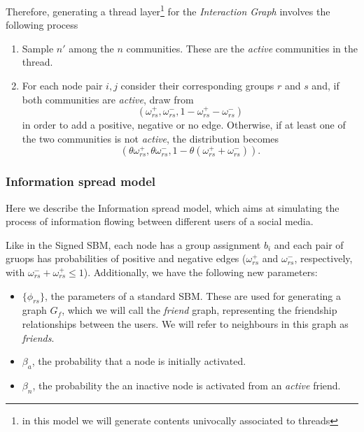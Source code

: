 Therefore, generating a thread layer\footnote{in this model we will generate contents univocally associated to threads} for the \emph{Interaction Graph} involves the following process
\begin{enumerate}
	\item Sample $n'$ among the $n$ communities. These are the
	      \emph{active} communities in the thread.
	\item For each node pair $i, j$ consider their corresponding groups $r$ and
	      $s$ and, if both communities are \emph{active},
	      draw from
	      \begin{equation*}
		      (\omega _{rs} ^{+}, \omega _{rs} ^{-}, 1 - \omega _{rs} ^{+} - \omega _{rs} ^{-})
	      \end{equation*}
	      in order to add a positive,
	      negative or no edge.
	      Otherwise, if at least one of the
	      two communities is not \emph{active}, the distribution becomes
	      \begin{equation*}
		      (\theta \omega _{rs} ^{+}, \theta \omega _{rs} ^{-}, 1 - \theta
		      (\omega _{rs} ^{+} + \omega _{rs} ^{-})).
	      \end{equation*}

\end{enumerate}

\subsubsection{Information spread model}%
\label{ssub:information_spread_model}

Here we describe the Information spread model, which aims at simulating the
process of information flowing between different users of a social media.

Like in the Signed SBM, each node has a group assignment $b_i$ and
each pair of gruops has probabilities of
positive and negative edges ($\omega _{rs}^{+}  $ and $\omega _{rs}^{-}  $,
respectively, with $\omega ^{-} _{rs} + \omega ^{+} _{rs}
	\leq 1$).
Additionally, we have the following new parameters:

\begin{itemize}
	\item $\{\phi_{rs} \}$, the parameters of a standard SBM. These are used for
	      generating a graph $G_f$, which we will call the \emph{friend} graph,
	      representing the friendship relationships between the users. We will
	      refer to neighbours in this graph as \emph{friends}.
	\item $\beta _a$, the probability that a node is initially activated.
	\item $\beta _n$, the probability the an inactive node is activated
	      from an \emph{active} friend.
\end{itemize}

